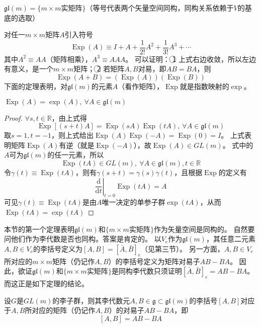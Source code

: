 \begin{theorem}
    $\mathfrak{gl}(m) = \{m \times m\text{实矩阵}\}$（等号代表两个矢量空间同构，同构关系依赖于$V$的基底的选取）
\end{theorem}

对任一$m \times m$矩阵$A$引入符号
$$\operatorname{Exp}(A) \equiv I + A + \frac{1}{2!}A^2 + \frac{1}{3!}A^3 + \cdots$$
其中$A^2 \equiv AA$（矩阵相乘），$A^3 \equiv AAA$。
可以证明：
\textcircled{1} 上式右边收敛，所以左边有意义，是一个$m \times m$矩阵；
\textcircled{2} 若矩阵$A, B$对易，即$AB = BA$，则
$$\operatorname{Exp}(A + B) = (\operatorname{Exp}(A))(\operatorname{Exp}(B))$$
下面的定理表明，对$\mathfrak{gl}(m)$的元素$A$（看作矩阵），$\operatorname{Exp}$就是指数映射的$\exp$。

\begin{theorem}
    $\operatorname{Exp}(A) = \exp(A), ~ \forall A \in \mathfrak{gl}(m)$
\end{theorem}

\begin{proof}
    $\forall s, t \in \mathbb{R}$，由上式得
    $$\operatorname{Exp}[(s + t)A] = \operatorname{Exp}(sA)\operatorname{Exp}(tA), ~ \forall A \in \mathfrak{gl}(m)$$
    取$s = 1, t = -1$，则上式给出$\operatorname{Exp}(A)\operatorname{Exp}(-A) = \operatorname{Exp}(0) = I$。
    上式表明矩阵$\operatorname{Exp}(A)$有逆（就是$\operatorname{Exp}(-A)$），故$\operatorname{Exp}(A) \in GL(m)$。
    式中的$A$可为$\mathfrak{gl}(m)$的任一元素，所以
    $$\operatorname{Exp}(tA) \in GL(m), ~ \forall A \in \mathfrak{gl}(m), t \in \mathbb{R}$$
    令$\gamma(t) \equiv \operatorname{Exp}(tA)$，则有$\gamma(s + t) = \gamma(s)\gamma(t)$，且根据$\operatorname{Exp}$的定义有
    $$\left.\frac{\mathrm{d}}{\mathrm{d}t}\right|_{t = 0}\operatorname{Exp}(tA) = A$$
    可见$\gamma(t) \equiv \operatorname{Exp}(tA)$是由$A$唯一决定的单参子群$\exp(tA)$，从而$\operatorname{Exp}(tA) = \exp(tA)$
\end{proof}

本节的第一个定理表明$\mathfrak{gl}(m)$和$\{m \times m\text{实矩阵}\}$作为矢量空间是同构的。
自然要问他们作为李代数是否也同构。答案是肯定的。
以$V_e$作为$\mathfrak{gl}(m)$，其任意二元素$A, B \in V_e$的李括号定义为$[A, B] = [\bar A, \bar B]_e$（见第三节）。
另一方面，$A, B \in V_e$所对应的$m \times m$矩阵（仍记作$A, B$）的李括号定义为矩阵对易子$AB - BA$。
因此，欲证$\mathfrak{gl}(m)$和$\{m \times m\text{实矩阵}\}$是同构李代数只须证明$[\bar A, \bar B]_e = AB - BA$。
而这正是如下定理的结论。

\begin{theorem}
    设$G$是$GL(m)$的李子群，则其李代数元$A, B \in \mathfrak{g} \subset \mathfrak{gl}(m)$的李括号$[A, B]$对应于$A, B$所对应的矩阵（仍记作$A, B$）的对易子$AB - BA$，即
    $$[A, B] = AB - BA$$
\end{theorem}

